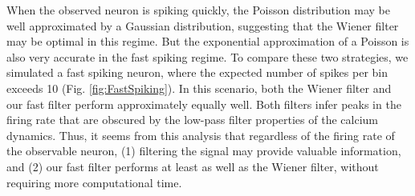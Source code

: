 When the observed neuron is spiking quickly, the Poisson distribution may be well approximated by a Gaussian distribution, suggesting that the Wiener filter may be optimal in this regime.  But the exponential approximation of a Poisson is also very accurate in the fast spiking regime.  To compare these two strategies, we simulated a fast spiking neuron, where the expected number of spikes per bin exceeds 10 (Fig. \ref{fig:FastSpiking}). In this scenario, both the Wiener filter and our fast filter perform approximately equally well.  Both filters infer peaks in the firing rate that are obscured by the low-pass filter properties of the calcium dynamics. Thus, it seems from this analysis that regardless of the firing rate of the observable neuron, (1) filtering the signal may provide valuable information, and (2) our fast filter performs at least as well as the Wiener filter, without requiring more computational time.


